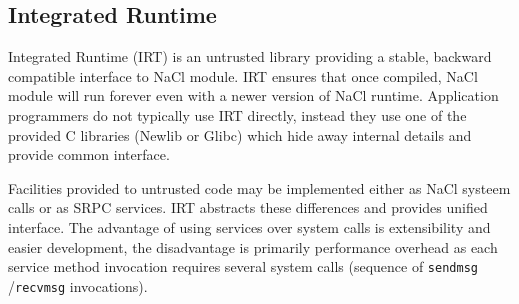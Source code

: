 \subsection{Integrated Runtime}

Integrated Runtime (IRT) is an untrusted library providing a stable,
backward compatible interface to NaCl module. IRT ensures that once
compiled, NaCl module will run forever even with a newer version of NaCl
runtime. Application programmers do not typically use IRT directly,
instead they use one of the provided C libraries (Newlib or Glibc) which
hide away internal details and provide common interface.

Facilities provided to untrusted code may be implemented either as NaCl
systeem calls or as SRPC services. IRT abstracts these differences and
provides unified interface. The advantage of using services over system
calls is extensibility and easier development, the disadvantage is
primarily performance overhead as each service method invocation
requires several system calls (\ie sequence of \lstinline`sendmsg`
/\lstinline`recvmsg` invocations).


